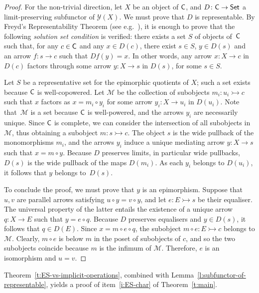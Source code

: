 \documentclass[a4paper,10pt,reqno]{amsart}
\theoremstyle{definition}
\theoremstyle{remark}
\newcommand{\cat}{{\sf C}}								%
\newcommand{\Set}{{\sf Set}}							%
\newcommand{\yo}{\mathcal{Y}}
\newcommand{\emb}{\rightarrowtail}							%
\begin{document}
\begin{proof}
For the non-trivial direction, let $X$ be an object of $\cat$, and $D\colon \cat\to\Set$ a limit-preserving subfunctor of $\yo(X)$. We must prove that $D$ is representable. By Freyd's Representability Theorem (see e.g.\ \cite[Theorem~4.6.15]{Riehl2016book}), it is enough to prove that the following \emph{solution set condition} is verified: there exists a set $S$ of objects of~$\cat$ such that, for any $c\in \cat$ and any $x\in D(c)$, there exist $s\in S$, $y\in D(s)$ and an arrow $f\colon s\to c$ such that $Df(y)=x$. In other words, any arrow $x\colon X\to c$ in $D(c)$ factors through some arrow $y\colon X\to s$ in $D(s)$, for some $s\in S$.

Let $S$ be a representative set for the epimorphic quotients of $X$; such a set exists because $\cat$ is well-copowered. Let $\mathcal{M}$ be the collection of subobjects $m_i\colon u_i \emb c$ such that $x$ factors as $x=m_i\circ y_i$ for some arrow $y_i\colon X\to u_i$ in $D(u_i)$. Note that~$\mathcal{M}$ is a set because $\cat$ is well-powered, and the arrows $y_i$ are necessarily unique.
%
Since $\cat$ is complete, we can consider the intersection of all subobjects in $\mathcal{M}$, thus obtaining a subobject $m\colon s\emb c$. The object $s$ is the wide pullback of the monomorphisms $m_i$, and the arrows $y_i$ induce a unique mediating arrow $y\colon X\to s$ such that $x = m\circ y$. Because $D$ preserves limits, in particular wide pullbacks, $D(s)$ is the wide pullback of the maps $D(m_i)$. As each $y_i$ belongs to $D(u_i)$, it follows that $y$ belongs to~$D(s)$.

To conclude the proof, we must prove that $y$ is an epimorphism. Suppose that $u,v$ are parallel arrows satisfying $u\circ y = v\circ y$, and let $e\colon E \emb s$ be their equaliser. The universal property of the latter entails the existence of a unique arrow $q\colon X\to E$ such that $y = e\circ q$. Because $D$ preserves equalisers and $y\in D(s)$, it follows that $q\in D(E)$. Since $x = m\circ e \circ q$, the subobject $m\circ e\colon E \emb c$ belongs to $\mathcal{M}$. Clearly, $m\circ e$ is below $m$ in the poset of subobjects of $c$, and so the two subobjects coincide because $m$ is the infimum of $\mathcal{M}$. Therefore, $e$ is an isomorphism and $u=v$.
\end{proof}

Theorem~\ref{t:ES-vs-implicit-operations}, combined with Lemma~\ref{l:subfunctor-of-representable}, yields a proof of item~\ref{i:ES-char} of Theorem~\ref{t:main}.
\end{document}
